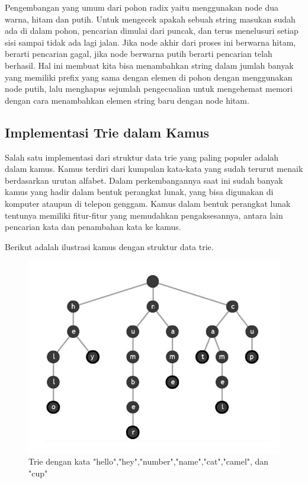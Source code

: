 Pengembangan yang umum dari pohon radix yaitu menggunakan node dua warna, hitam dan putih. Untuk mengecek apakah sebuah string masukan sudah ada di dalam pohon, pencarian dimulai dari puncak, dan terus menelusuri setiap sisi sampai tidak ada lagi jalan. Jika node akhir dari proses ini berwarna hitam, berarti pencarian gagal, jika node berwarna putih berarti pencarian telah berhasil. Hal ini membuat kita bisa menambahkan string dalam jumlah banyak yang memiliki prefix yang sama dengan elemen di pohon dengan menggunakan node putih, lalu menghapus sejumlah pengecualian untuk mengehemat memori dengan cara menambahkan elemen string baru dengan node hitam.

\subsection{Implementasi Trie dalam Kamus}
\label{sec:kamus}

Salah satu implementasi dari struktur data trie yang paling populer adalah dalam kamus. Kamus terdiri dari kumpulan kata-kata yang sudah terurut menaik berdasarkan urutan alfabet. Dalam perkembangannya saat ini sudah banyak kamus yang hadir dalam bentuk perangkat lunak, yang bisa digunakan di komputer ataupun di telepon genggam. Kamus dalam bentuk perangkat lunak tentunya memiliki fitur-fitur yang memudahkan pengaksesannya, antara lain pencarian kata dan penambahan kata ke kamus.

Berikut adalah ilustrasi kamus dengan struktur data trie.

\begin{figure}[H]
\centering
\includegraphics[scale=1.25]{Gambar/contoh-trie-2}
\caption[Trie dengan kata "hello","hey","number","name","cat","camel", dan "cup"]{Trie dengan kata "hello","hey","number","name","cat","camel", dan "cup"\cite{najogie:10:trie}} 
\label{contoh-trie-2}
\end{figure}

